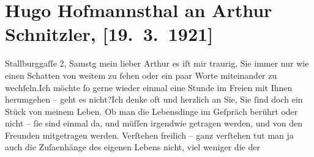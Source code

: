 

         
         \renewcommand{\erwaehntePersonen}{Personen: Frieda Pollak}
         \renewcommand{\erwaehnteOrte}{Orte: Gürtel, Hofmannsthal-Schlössl, Mauer, Maurer Berg, Rodaun, Stallburggasse, Wien}
         \renewcommand{\erwaehnteWerke}{}
               \section[Hugo Hofmannsthal an Arthur Schnitzler, {[}19. 3. 1921{]}]{ Hugo Hofmannsthal an Arthur Schnitzler, {[}19. 3. 1921{]}}\nopagebreak{}\rehead{ }\begin{ledgroupsized}[t]{13cm}\normalsize\beginnumbering \toendnotes[C]{\smallbreak\pagebreak[2]} 
\toendnotes[C]{\smallbreak}\pstart
           \raggedleft{}{\pb}Stallburggaſſe 2, Samstg\pend
           \pstart{}mein lieber Arthur\pend\pstart
           es iſt mir traurig, Sie immer nur wie einen Schatten von weitem zu ſehen oder ein
               paar Worte miteinander zu wechſeln.\hspace*{1.5em}Ich möchte ſo
               gerne wieder einmal eine Stunde im Freien mit Ihnen herumgehen – geht es nicht?\hspace*{1.5em}Ich denke oft und herzlich an Sie, Sie ſind doch ein
               Stück von meinem Leben. Ob man die Lebensdinge im Geſpräch berührt oder nicht – ſie
               sind einmal {\pb}da, und müſſen
               irgendwie getragen werden, und von den Freunden mitgetragen werden.\pend
           \pstart
           Verſtehen freilich – ganz verſtehen tut man ja auch die Zuſa{\geminationm}enhänge des eigenen Lebens nicht, viel weniger die der

\end{ledgroupsized}
